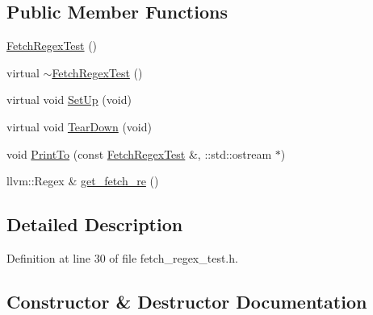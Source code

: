 \subsection*{Public Member Functions}
\begin{DoxyCompactItemize}
\item 
\hyperlink{classclang_1_1tidy_1_1pagesjaunes_1_1test_1_1_fetch_regex_test_a73b6c20c0eb01f5774d882566eb9b058}{Fetch\+Regex\+Test} ()
\item 
virtual \hyperlink{classclang_1_1tidy_1_1pagesjaunes_1_1test_1_1_fetch_regex_test_aee617991acb0de562785da583ab69ed3}{$\sim$\+Fetch\+Regex\+Test} ()
\item 
virtual void \hyperlink{classclang_1_1tidy_1_1pagesjaunes_1_1test_1_1_fetch_regex_test_ae96c5d042140c690da3decd805595303}{Set\+Up} (void)
\item 
virtual void \hyperlink{classclang_1_1tidy_1_1pagesjaunes_1_1test_1_1_fetch_regex_test_ac036eea590bd85744269af0eae8f456e}{Tear\+Down} (void)
\item 
void \hyperlink{classclang_1_1tidy_1_1pagesjaunes_1_1test_1_1_fetch_regex_test_ae15287c4bf717c39dcc7b29c4d56da7e}{Print\+To} (const \hyperlink{classclang_1_1tidy_1_1pagesjaunes_1_1test_1_1_fetch_regex_test}{Fetch\+Regex\+Test} \&, \+::std\+::ostream $\ast$)
\item 
llvm\+::\+Regex \& \hyperlink{classclang_1_1tidy_1_1pagesjaunes_1_1test_1_1_fetch_regex_test_a5592b292a7f1ea04f6496bef687d9f80}{get\+\_\+fetch\+\_\+re} ()
\end{DoxyCompactItemize}


\subsection{Detailed Description}


Definition at line 30 of file fetch\+\_\+regex\+\_\+test.\+h.



\subsection{Constructor \& Destructor Documentation}
\mbox{\label{classclang_1_1tidy_1_1pagesjaunes_1_1test_1_1_fetch_regex_test_a73b6c20c0eb01f5774d882566eb9b058}} 
